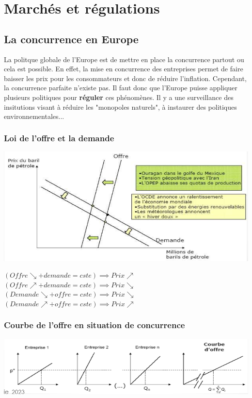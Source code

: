 \chapter{Marchés et régulations}
\section{La concurrence en Europe}
La politque globale de l'Europe est de mettre en place la concurrence partout ou cela est possible. En effet, la mise en concurrence des entreprises permet de faire baisser les prix pour les consommateurs et donc de réduire l'inflation. Cependant, la concurrence parfaite n'existe pas. Il faut donc que l'Europe puisse appliquer plusieurs politiques pour \textbf{réguler} ces phénomènes. Il y a une surveillance des insitutions visant à réduire les "monopoles naturels", à instaurer des politiques environnementales... \newpage

\subsection{Loi de l'offre et la demande}
\begin{center}
    \includegraphics[scale=0.7]{Pics/Offre_et_demande.png}    
\end{center}
$(Offre \searrow + demande = cste) \implies Prix \nearrow$ \newline
$(Offre \nearrow + demande = cste) \implies Prix \searrow$ \newline
$(Demande \searrow + offre = cste) \implies Prix \searrow$ \newline
$(Demande \nearrow + offre = cste) \implies Prix \nearrow$
\subsection{Courbe de l'offre en situation de concurrence}
\begin{center}
    \includegraphics[scale=0.8]{Pics/Courbe_de_l_offre.png}
\end{center}
\newpage
